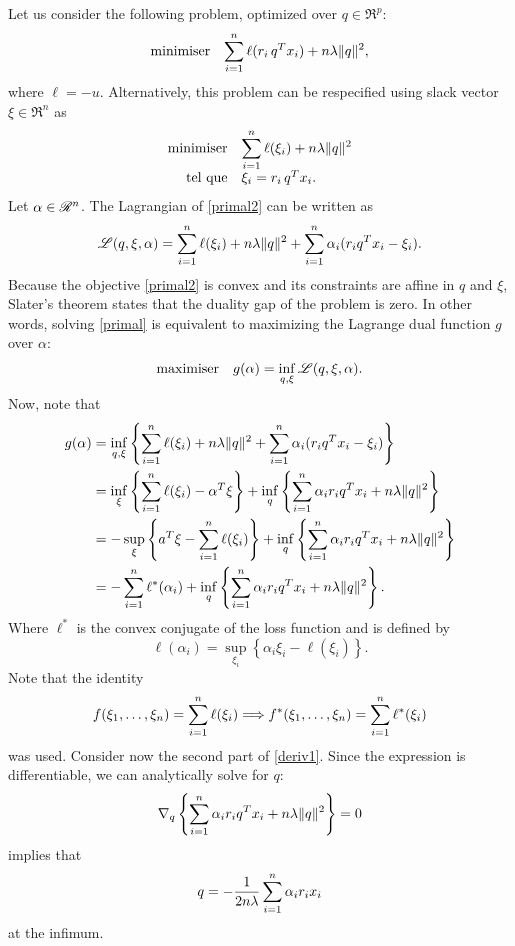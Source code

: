 Let us consider the following problem, optimized over $q \in \Re^p$:
\begin{equation}
  \label{primal}
  \begin{array}{ll} \displaystyle{\operatorname*{minimiser}_{}} & \displaystyle{\sum_{i=1}^n\ell(r_i\,q^Tx_i) + n\lambda\|q\|^2,} \end{array}
\end{equation}
where $\ell=-u$. Alternatively, this problem can be respecified using slack vector
$\xi \in \Re^n$ as
\begin{equation}
  \minimizeEquationSt{\label{primal2}\sumi \ell(\xi_i) + n\lambda\|q\|^2}[\xi_i = r_i\,q^Tx_i.] 
\end{equation}
Let $\alpha\in\mathscr{R}^n$. The Lagrangian of \eqref{primal2} can be written as
\begin{equation}
  \mathscr{L}(q,\xi,\alpha) = \sum_{i=1}^n \ell(\xi_i) + n\lambda\|q\|^2 + \sum_{i=1}^n \alpha_i(r_iq^Tx_i - \xi_i).
\end{equation}
Because the objective \eqref{primal2} is convex and its constraints are affine in $q$ and
$\xi$, Slater's theorem states that the duality gap of the problem is zero. In other words,
solving \eqref{primal} is equivalent to maximizing the Lagrange dual function $g$ over
$\alpha$:
\begin{equation}
  \displaystyle{\begin{array}{ll} \displaystyle{\operatorname*{maximiser}_{}} & \displaystyle{g(\alpha) = \inf_{q,\xi} \mathscr{L}(q,\xi,\alpha).} \end{array}}
\end{equation}
Now, note that
\begin{align}
  g(\alpha)
  &= \inf_{q,\xi} \left\{\sum_{i=1}^n \ell(\xi_i) + n\lambda\|q\|^2 + \sum_{i=1}^n \alpha_i(r_iq^Tx_i -
    \xi_i)\right\}\\
  &= \inf_\xi\left\{\sum_{i=1}^n \ell(\xi_i) - \alpha^T\xi\right\} + \inf_q\left\{\sum_{i=1}^n \alpha_ir_iq^Tx_i +
    n\lambda\|q\|^2\right\}\\
  & = -\sup_\xi\left\{a^T\xi - \sum_{i=1}^n \ell(\xi_i)\right\} + \inf_q\left\{\sum_{i=1}^n \alpha_ir_iq^Tx_i +
    n\lambda\|q\|^2\right\}\\
  & = -\sum_{i=1}^n \ell^*(\alpha_i) + \inf_q\left\{\sum_{i=1}^n \alpha_ir_iq^Tx_i +n\lambda\|q\|^2\right\}.\label{deriv1} 
\end{align}
Where $\ell^*$ is the convex conjugate of the loss function and is defined by
\begin{equation}
  \ell(\alpha_i) = \sup_{\xi_i}\left\{\alpha_i\xi_i - \ell(\xi_i)\right\}.
\end{equation}
Note that the identity
\begin{equation}
  \label{lemma1}
  f(\xi_1,\dots,\xi_n) = \sum_{i=1}^n \ell(\xi_i) \Longrightarrow f^*(\xi_1,\dots,\xi_n) = \sum_{i=1}^n \ell^*(\xi_i)
\end{equation}
was used. Consider now the second part of \eqref{deriv1}. Since
the expression is differentiable, we can analytically solve for $q$:
\begin{equation}
  \nabla_q \left\{\sum_{i=1}^n \alpha_ir_iq^Tx_i + n\lambda\|q\|^2\right\} = 0
\end{equation}
implies that
\begin{equation}
 q = -\frac{1}{2n\lambda}\sum_{i=1}^n \alpha_ir_ix_i \label{qdef}
\end{equation}
at the infimum.

